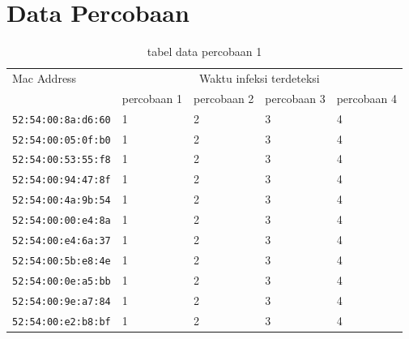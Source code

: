 \chapter{Data Percobaan}

\begin{table}[H]
	\caption{tabel data percobaan 1}
	\label{table:data percobaan 1}
	\centering
	\begin{tabular}{|l|l|l|l|l|}
		\hline
		\multirow{2}{*}{\footnotesize{Mac Address}} & \multicolumn{4}{c|}{\footnotesize{Waktu infeksi terdeteksi}} \\ \cline{2-5} 
		& \footnotesize{percobaan 1} & \footnotesize{percobaan 2} & \footnotesize{percobaan 3} & \footnotesize{percobaan 4}\\ \hline
		\footnotesize{\verb|52:54:00:8a:d6:60|} &1 &2 &3 &4 \\ \hline
		\footnotesize{\verb|52:54:00:05:0f:b0|} &1 &2 &3 &4 \\ \hline
		\footnotesize{\verb|52:54:00:53:55:f8|} &1 &2 &3 &4 \\ \hline
		\footnotesize{\verb|52:54:00:94:47:8f|} &1 &2 &3 &4 \\ \hline
		\footnotesize{\verb|52:54:00:4a:9b:54|} &1 &2 &3 &4 \\ \hline
		\footnotesize{\verb|52:54:00:00:e4:8a|} &1 &2 &3 &4 \\ \hline
		\footnotesize{\verb|52:54:00:e4:6a:37|} &1 &2 &3 &4 \\ \hline
		\footnotesize{\verb|52:54:00:5b:e8:4e|} &1 &2 &3 &4 \\ \hline
		\footnotesize{\verb|52:54:00:0e:a5:bb|} &1 &2 &3 &4 \\ \hline
		\footnotesize{\verb|52:54:00:9e:a7:84|} &1 &2 &3 &4 \\ \hline
		\footnotesize{\verb|52:54:00:e2:b8:bf|} &1 &2 &3 &4 \\ \hline
	\end{tabular}
\end{table}